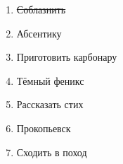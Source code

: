 \documentclass[12pt]{extarticle}
\author{Горбунов Роман, 307 группа}
\date{2018}
\title{}
\begin{document}
\begin{enumerate}
	\item \sout{Соблазнить}
	\item {Абсентику}
	\item {Приготовить карбонару}
	\item {Тёмный феникс}
	\item {Рассказать стих}
	\item {Прокопьевск}
	\item {Сходить в поход}
\end{enumerate}
\end{document}
